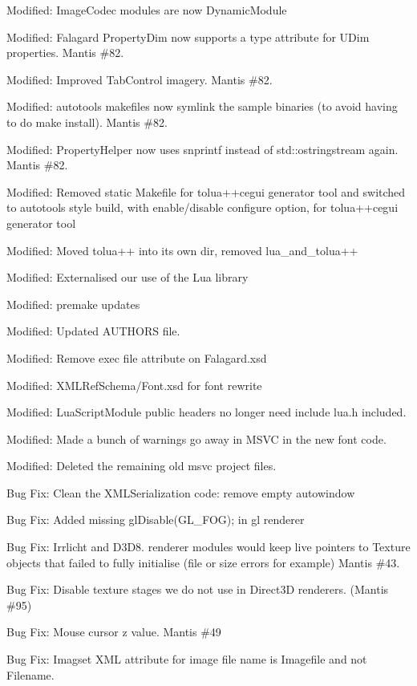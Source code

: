 \begin{DoxyItemize}
\item Modified\+: Image\+Codec modules are now Dynamic\+Module
\item Modified\+: Falagard Property\+Dim now supports a type attribute for U\+Dim properties. Mantis \#82.
\item Modified\+: Improved Tab\+Control imagery. Mantis \#82.
\item Modified\+: autotools makefiles now symlink the sample binaries (to avoid having to do \textquotesingle{}make install\textquotesingle{}). Mantis \#82.
\item Modified\+: Property\+Helper now uses snprintf instead of std\+::ostringstream again. Mantis \#82.
\item Modified\+: Removed static Makefile for tolua++cegui generator tool and switched to autotools style build, with enable/disable configure option, for tolua++cegui generator tool
\item Modified\+: Moved tolua++ into it\textquotesingle{}s own dir, removed lua\+\_\+and\+\_\+tolua++
\item Modified\+: Externalised our use of the Lua library
\item Modified\+: premake updates
\item Modified\+: Updated A\+U\+T\+H\+O\+RS file.
\item Modified\+: Remove exec file attribute on Falagard.\+xsd
\item Modified\+: X\+M\+L\+Ref\+Schema/\+Font.\+xsd for font rewrite
\item Modified\+: Lua\+Script\+Module public headers no longer need include lua.\+h included.
\item Modified\+: Made a bunch of warnings go away in M\+S\+VC in the new font code.
\item Modified\+: Deleted the remaining old msvc project files.
\item Bug Fix\+: Clean the X\+M\+L\+Serialization code\+: remove empty autowindow
\item Bug Fix\+: Added missing gl\+Disable(\+G\+L\+\_\+\+F\+O\+G); in gl renderer
\item Bug Fix\+: Irrlicht and D3\+D8. renderer modules would keep live pointers to Texture objects that failed to fully initialise (file or size errors for example) Mantis \#43.
\item Bug Fix\+: Disable texture stages we do not use in Direct3D renderers. (Mantis \#95)
\item Bug Fix\+: Mouse cursor z value. Mantis \#49
\item Bug Fix\+: Imagset X\+ML attribute for image file name is \textquotesingle{}Imagefile\textquotesingle{} and not \textquotesingle{}Filename\textquotesingle{}.

\end{DoxyItemize}
